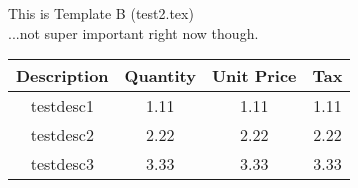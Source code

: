 \documentclass{article}
\begin{document}
\centering
This is Template B (test2.tex)\\
...not super important right now though.

\begin{table}[h]
\centering
\begin{tabular}{cccc}

\hline
Description & Quantity & Unit Price & Tax \\
\hline
testdesc1 & 1.11 & 1.11 & 1.11 \\\hline
testdesc2 & 2.22 & 2.22 & 2.22 \\\hline
testdesc3 & 3.33 & 3.33 & 3.33 \\\hline

\end{tabular}
\end{table}
\end{document}
